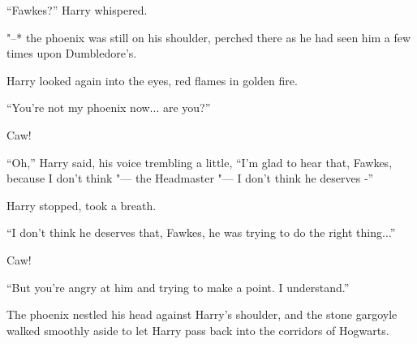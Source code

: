 ``Fawkes?'' Harry whispered.

"--* the phoenix was still on his shoulder, perched there as he had seen
him a few times upon Dumbledore's.

Harry looked again into the eyes, red flames in golden fire.

``You're not my phoenix now... are you?''

Caw!

``Oh,'' Harry said, his voice trembling a little, ``I'm glad to hear
that, Fawkes, because I don't think "--- the Headmaster "--- I don't think he
deserves -''

Harry stopped, took a breath.

``I don't think he deserves that, Fawkes, he was trying to do the right
thing...''

Caw!

``But you're angry at him and trying to make a point. I understand.''

The phoenix nestled his head against Harry's shoulder, and the stone
gargoyle walked smoothly aside to let Harry pass back into the corridors
of Hogwarts.
